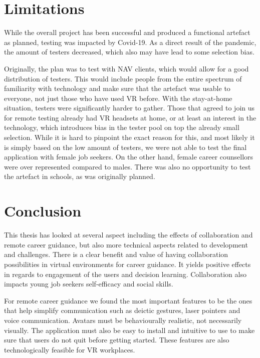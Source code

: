 \section{Limitations}
While the overall project has been successful and produced a functional artefact as planned, testing was impacted by Covid-19. As a direct result of the pandemic, the amount of testers decreased, which also may have lead to some selection bias.

Originally, the plan was to test with NAV clients, which would allow for a good distribution of testers. This would include people from the entire spectrum of familiarity with technology and make sure that the artefact was usable to everyone, not just those who have used VR before. With the stay-at-home situation, testers were significantly harder to gather. Those that agreed to join us for remote testing already had VR headsets at home, or at least an interest in the technology, which introduces bias in the tester pool on top the already small selection. While it is hard to pinpoint the exact reason for this, and most likely it is simply based on the low amount of testers, we were not able to test the final application with female job seekers. On the other hand, female career counsellors were over represented compared to males. There was also no opportunity to test the artefact in schools, as was originally planned.






\section{Conclusion}
This thesis has looked at several aspect including the effects of collaboration and remote career guidance, but also more technical aspects related to development and challenges. 
There is a clear benefit and value of having collaboration possibilities in virtual environments for career guidance. It yields positive effects in regards to engagement of the users and decision learning. Collaboration also impacts young job seekers self-efficacy and social skills. 

For remote career guidance we found the most important features to be the ones that help simplify communication such as deictic gestures, laser pointers and voice communication. Avatars must be behaviourally realistic, not necessarily visually. The application must also be easy to install and intuitive to use to make sure that users do not quit before getting started. These features are also technologically feasible for VR workplaces.

